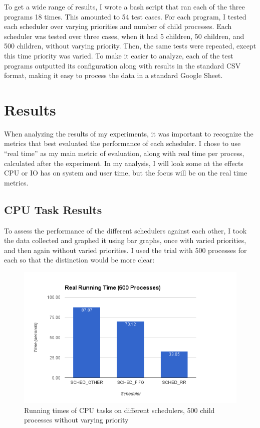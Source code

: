 \documentclass{article}
\begin{document}
To get a wide range of results, I wrote a bash script that ran each of the three programs 18 times. This amounted to 54 test cases. For each program, I tested each scheduler over varying priorities and number of child processes. Each scheduler was tested over three cases, when it had 5 children, 50 children, and 500 children, without varying priority. Then, the same tests were repeated, except this time priority was varied. To make it easier to analyze, each of the test programs outputted its configuration along with results in the standard CSV format, making it easy to process the data in a standard Google Sheet.

\section{Results}

When analyzing the results of my experiments, it was important to recognize the metrics that best evaluated the performance of each scheduler. I chose to use “real time” as my main metric of evaluation, along with real time per process, calculated after the experiment. In my analysis, I will look some at the effects CPU or IO has on system and user time, but the focus will be on the real time metrics.

\subsection{CPU Task Results}
To assess the performance of the different schedulers against each other, I took the data collected and graphed it using bar graphs, once with varied priorities, and then again without varied priorities. I used the trial with 500 processes for each so that the distinction would be more clear:

\begin{figure}[H]
  \centering
  \includegraphics[width=0.8\linewidth]{CPUNotVaried.png}
  \caption{Running times of CPU tasks on different schedulers, 500 child processes without varying priority}
\end{figure}
\end{document}
